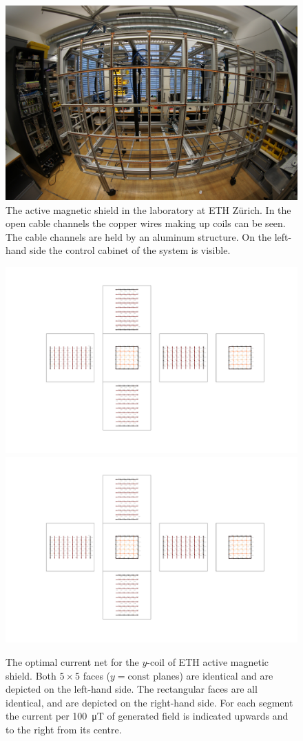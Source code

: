 \begin{figure}
  \centering
  \includegraphics[width=0.75\linewidth]{gfx/prototype/prototype_photo.jpg}
  \caption{The active magnetic shield in the laboratory at ETH Zürich. In the open cable channels the copper wires making up coils can be seen. The cable channels are held by an aluminum structure. On the left-hand side the control cabinet of the system is visible.}\label{fig:prototype_photo}
\end{figure}

\begin{figure}
  \centering
  \includegraphics[height=0.3\linewidth]{gfx/prototype/coil_design_y_100uT_1.pdf}
  \quad\quad
  \includegraphics[height=0.3\linewidth]{gfx/prototype/coil_design_y_100uT_2.pdf}
  \caption{The optimal current net for the $y$-coil of ETH active magnetic shield. Both $5 \times 5$ faces ($y = \mathrm{const}$ planes) are identical and are depicted on the left-hand side. The rectangular faces are all identical, and are depicted on the right-hand side. For each segment the current per \SI{100}{\micro\tesla} of generated field is indicated upwards and to the right from its centre.}\label{fig:prototype_coil_y_currents}
\end{figure}

